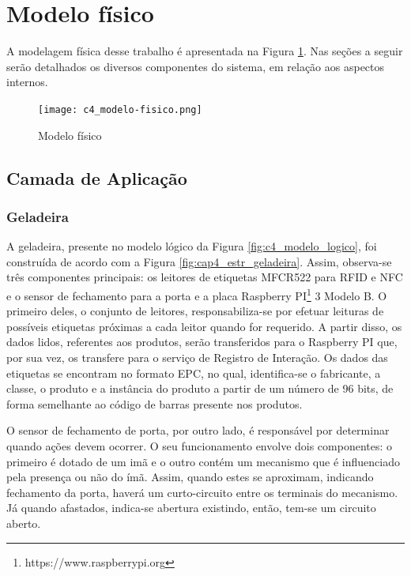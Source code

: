 \section{Modelo físico}


A modelagem física desse trabalho é apresentada na Figura \ref{fig:c4_modelo_fisico}. Nas seções a seguir serão detalhados os diversos componentes do sistema, em relação aos aspectos internos.


\begin{figure}[htb]
    \caption{Modelo físico}
    \label{fig:c4_modelo_fisico}
    \texttt{[image: c4\_modelo-fisico.png]}
\end{figure}

\subsection{Camada de Aplicação}

\subsubsection{Geladeira}

A geladeira, presente no modelo lógico da Figura \ref{fig:c4_modelo_logico}, foi construída de acordo com a Figura \ref{fig:cap4_estr_geladeira}. Assim, observa-se três componentes principais: os leitores de etiquetas MFCR522 para RFID e NFC e o sensor de fechamento para a porta e a placa Raspberry PI\textsuperscript{\textregistered}\footnote{https://www.raspberrypi.org} 3 Modelo B. O primeiro deles, o conjunto de leitores, responsabiliza-se por efetuar leituras de possíveis etiquetas próximas a cada leitor quando for requerido. A partir disso, os dados lidos, referentes aos produtos, serão transferidos para o Raspberry PI que, por sua vez, os transfere para o serviço de Registro de Interação. Os dados das etiquetas se encontram no formato EPC, no qual, identifica-se o fabricante, a classe, o produto e a instância do produto a partir de um número de 96 bits, de forma semelhante ao código de barras presente nos produtos.

O sensor de fechamento de porta, por outro lado, é responsável por determinar quando ações devem ocorrer. O seu funcionamento envolve dois componentes: o primeiro é dotado de um imã e o outro contém um mecanismo que é influenciado pela presença ou não do ímã. Assim, quando estes se aproximam, indicando fechamento da porta, haverá um curto-circuito entre os terminais do mecanismo. Já quando afastados, indica-se abertura existindo, então, tem-se um circuito aberto.

